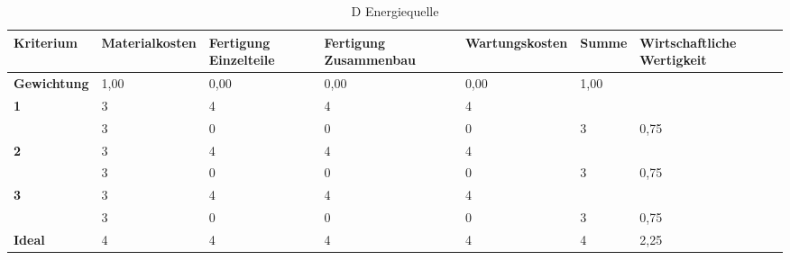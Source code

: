 \documentclass[10pt,a4paper]{article}
\begin{document}
\begin{table}[h!]
    \centering
    \hspace*{0in} %
    \begin{tabular}{>{\bfseries}p{2cm} p{2.2cm} p{2cm} p{2cm} p{2.5cm} p{2cm} p{2cm}}
        \toprule
        Kriterium  & Materialkosten & Fertigung Einzelteile & Fertigung Zusammenbau & Wartungskosten & Summe & Wirtschaftliche Wertigkeit \\
        \midrule
        Gewichtung & 1,00           & 0,00                  & 0,00                  & 0,00           & 1,00  &                            \\
        \midrule
        1          & 3              & 4                     & 4                     & 4              &       &                            \\
                   & 3              & 0                     & 0                     & 0              & 3     & 0,75                       \\
        \midrule
        2          & 3              & 4                     & 4                     & 4              &       &                            \\
                   & 3              & 0                     & 0                     & 0              & 3     & 0,75                       \\
        \midrule
        3          & 3              & 4                     & 4                     & 4              &       &                            \\
                   & 3              & 0                     & 0                     & 0              & 3     & 0,75                       \\
        \midrule
        Ideal      & 4              & 4                     & 4                     & 4              & 4     & 2,25                       \\
        \bottomrule
    \end{tabular}
    \caption{D Energiequelle}
\end{table}
\end{document}
